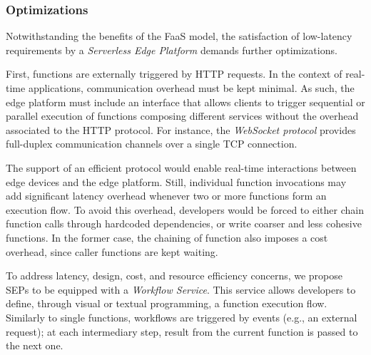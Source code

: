 \subsubsection{Optimizations}
Notwithstanding the benefits of the FaaS model,
the satisfaction of low-latency requirements by a \textit{Serverless Edge Platform} demands further optimizations.

First, functions are externally triggered by HTTP requests. In the context of real-time applications, communication overhead must be kept minimal. As such, the edge platform must include an interface that allows clients to trigger sequential or parallel execution of functions composing different services without the overhead associated to the HTTP protocol. For instance, the \textit{WebSocket protocol}
provides full-duplex communication channels over a single TCP connection. %


The support of an efficient protocol would enable real-time interactions between edge devices and the edge platform. Still, individual function invocations may add significant latency overhead whenever two or more functions form an execution flow. To avoid this overhead, developers would be forced to either chain function calls through hardcoded dependencies, or write coarser and less cohesive functions. In the former case, the chaining of function also imposes a cost overhead, since caller functions are kept waiting.%

To address latency, design, cost, and resource efficiency concerns, we propose SEPs to be equipped with a \textit{Workflow Service}. This service allows developers to define, through visual or textual programming, a function execution flow.
Similarly to single functions, workflows are triggered by events (e.g., an external request); at each intermediary step, result from the current function is passed to the next one. 

